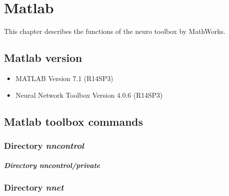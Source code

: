\chapter{Matlab}
This chapter describes the functions of the neuro toolbox by MathWorks.

\section{Matlab version}
\begin{itemize}
	\item MATLAB Version 7.1 (R14SP3)
	\item Neural Network Toolbox Version 4.0.6 (R14SP3)
\end{itemize}

%


 

\section{Matlab toolbox commands}
\subsection{Directory \textit{nncontrol}}

\paragraph{Directory \textit{nncontrol/private}}

\subsection{Directory \textit{nnet}}


